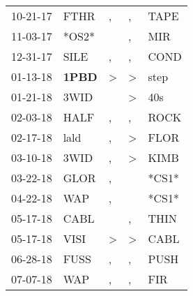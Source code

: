 \begin{supertabular}{p{0.07\textwidth}p{0.06\textwidth}p{0.02\textwidth}p{0.02\textwidth}p{0.06\textwidth}}
          10-21-17\textsuperscript{} &           FTHR\textsuperscript{} &                , &                , &           TAPE\textsuperscript{} \\
          11-03-17\textsuperscript{} &                            *OS2* &                  &                , &            MIR\textsuperscript{} \\
          12-31-17\textsuperscript{} &           SILE\textsuperscript{} &                , &                , &           COND\textsuperscript{} \\
          01-13-18\textsuperscript{} &  \textbf{1PBD\textsuperscript{}} &     \textgreater &     \textgreater &           step\textsuperscript{} \\
          01-21-18\textsuperscript{} &           3WID\textsuperscript{} &                  &     \textgreater &            40s\textsuperscript{} \\
          02-03-18\textsuperscript{} &           HALF\textsuperscript{} &                , &                , &           ROCK\textsuperscript{} \\
          02-17-18\textsuperscript{} &           lald\textsuperscript{} &                , &     \textgreater &           FLOR\textsuperscript{} \\
          03-10-18\textsuperscript{} &           3WID\textsuperscript{} &                , &     \textgreater &           KIMB\textsuperscript{} \\
          03-22-18\textsuperscript{} &           GLOR\textsuperscript{} &                , &                  &                            *CS1* \\
          04-22-18\textsuperscript{} &            WAP\textsuperscript{} &                , &                  &                            *CS1* \\
          05-17-18\textsuperscript{} &           CABL\textsuperscript{} &                  &                , &           THIN\textsuperscript{} \\
          05-17-18\textsuperscript{} &           VISI\textsuperscript{} &     \textgreater &     \textgreater &           CABL\textsuperscript{} \\
          06-28-18\textsuperscript{} &           FUSS\textsuperscript{} &                , &                , &           PUSH\textsuperscript{} \\
          07-07-18\textsuperscript{} &            WAP\textsuperscript{} &                , &                , &            FIR\textsuperscript{} \\

\end{supertabular}
